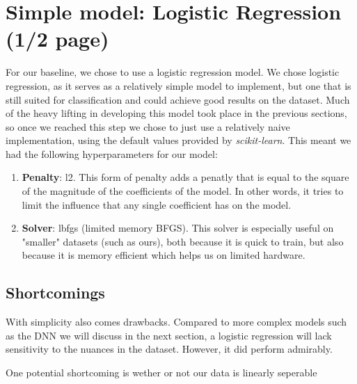\section{Simple model: Logistic Regression (1/2 page)} 
For our baseline, we chose to use a logistic regression model. We chose logistic regression, as it serves as a
relatively simple model to implement, but one that is still suited for classification and could achieve good results on
the dataset. Much of the heavy lifting in developing this model took place in the previous sections,
so once we reached this step we chose to just use a relatively naive implementation, using the default values provided
by \textit{scikit-learn}. This meant we had the following hyperparameters for our model:

\begin{enumerate}
  \item \textbf{Penalty}: l2. This form of penalty adds a penatly that is equal to the square of the magnitude of the
    coefficients of the model. In other words, it tries to limit the influence that any single coefficient has on the
    model.

  \item \textbf{Solver}: lbfgs (limited memory BFGS). This solver is especially useful on "smaller" datasets (such as
    ours), both because it is quick to train, but also because it is memory efficient which helps us on limited
    hardware.

\end{enumerate}

\subsection{Shortcomings}
With simplicity also comes drawbacks. Compared to more complex models such as the DNN we will discuss in the next
section, a logistic regression will lack sensitivity to the nuances in the dataset. However, it did perform admirably.

One potential shortcoming is wether or not our data is linearly seperable


